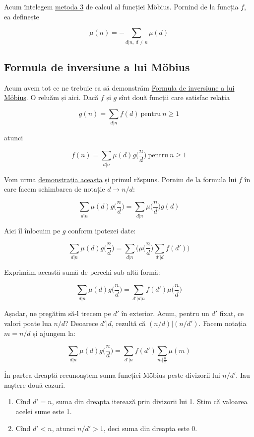 \documentclass[../main.tex]{subfiles}
\begin{document}
Acum înțelegem \hyperref[subsubseq:mobius-method-3]{metoda 3} de calcul al funcției Möbius. Pornind de la funcția $f$, ea definește

$$\mu(n) = -\sum_{d|n,\ d \neq n} \mu(d)$$

\subsection{Formula de inversiune a lui Möbius}

Acum avem tot ce ne trebuie ca să demonstrăm \href{https://en.wikipedia.org/wiki/M\%C3\%B6bius_inversion_formula}{Formula de inversiune a lui Möbius}. O reluăm și aici. Dacă $f$ și $g$ sînt două funcții care satisfac relația

$$g(n) = \sum_{d|n} f(d) \ \textrm{pentru}\ n \geq 1$$

atunci

$$f(n) = \sum_{d|n} \mu(d) g\Big(\frac{n}{d}\Big) \ \textrm{pentru}\ n \geq 1$$

Vom urma \href{https://math.stackexchange.com/q/1757352}{demonstrația aceasta} și primul răspuns. Pornim de la formula lui $f$ în care facem schimbarea de notație $d \to n/d$:

$$\sum_{d|n} \mu(d) g\Big(\frac{n}{d}\Big) = \sum_{d|n} \mu\Big(\frac{n}{d}\Big) g(d)$$

Aici îl înlocuim pe $g$ conform ipotezei date:

$$\sum_{d|n} \mu(d) g\Big(\frac{n}{d}\Big) = \sum_{d|n} \Biggl(\mu\Big(\frac{n}{d}\Big) \sum_{d'|d} f(d')\Biggr)$$

Exprimăm această sumă de perechi sub altă formă:

$$\sum_{d|n} \mu(d) g\Big(\frac{n}{d}\Big) = \sum_{d'|d|n} f(d') \mu\Big(\frac{n}{d}\Big)$$

Așadar, ne pregătim să-l trecem pe $d'$ în exterior. Acum, pentru un $d'$ fixat, ce valori poate lua $n/d$? Deoarece $d'|d$, rezultă că $(n/d) | (n/d')$. Facem notația $m = n/d$ și ajungem la:

$$\sum_{d|n} \mu(d) g\Big(\frac{n}{d}\Big) = \sum_{d'|n} f(d') \sum_{m|\frac{n}{d'}}\mu(m)$$

În partea dreaptă recunoaștem suma funcției Möbius peste divizorii lui $n/d'$. Iau naștere două cazuri.

\begin{enumerate}
  \item Cînd $d' = n$, suma din dreapta iterează prin divizorii lui 1. Știm că valoarea acelei sume este 1.

  \item Cînd $d' < n$, atunci $n/d' > 1$, deci suma din dreapta este 0.
\end{enumerate}
\end{document}

